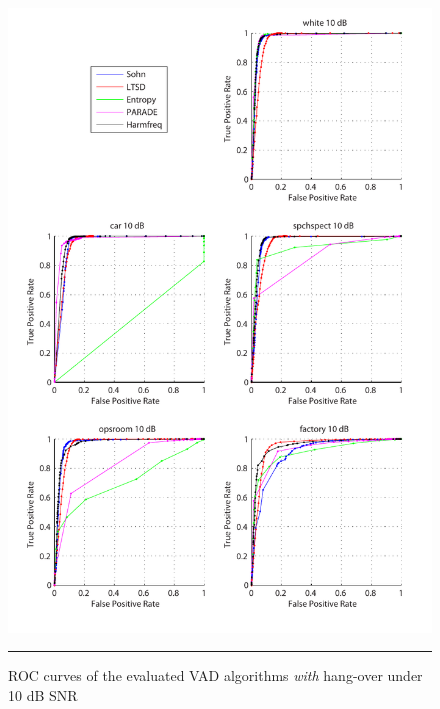 \begin{figure}[htbp]
	\centering
		\includegraphics[width=1.0\columnwidth]{Figures/Chapter3/10dBh.pdf}
		\rule{37em}{0.5pt}
	\caption[ROC curves of the evaluated algorithms \emph{with} hang-over under 10 dB SNR]{ROC curves of the evaluated VAD algorithms \emph{with} hang-over under 10 dB SNR}
	\label{fig:10dBh}
\end{figure}

